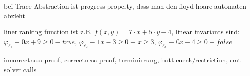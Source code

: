 \documentclass[landscape, a4paper]{article}
\begin{document}
\begin{minipage}[t]{0.2\linewidth}
\begin{betterlist}
		\item bei Trace Abstraction ist progress property, dass man den floyd-hoare automaten abzieht
		\item liner ranking function ist z.B. $f(x, y) = 7\cdot x + 5\cdot y −4$, linear invariants sind: $\varphi_{\ell_1} \equiv 0x + 9 \geq 0\equiv true$, $\varphi_{\ell_2} \equiv 1x −3 \geq 0 \equiv x \geq 3$, $ \varphi_{\ell_3} \equiv 0x −4 \geq 0 \equiv false$
		\item incorrectness proof, correctness proof, terminierung, bottleneck/restriction, smt-solver calls
	\end{betterlist}
\end{minipage}
\begin{minipage}[t]{0.2\linewidth}
\end{minipage}
\begin{minipage}[t]{0.2\linewidth}
\end{minipage}
\end{document}
